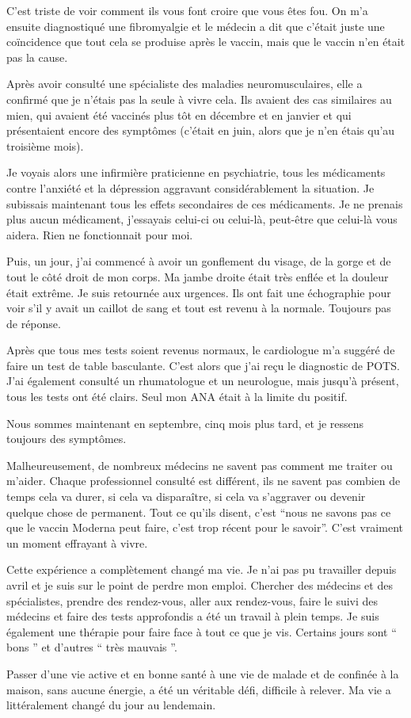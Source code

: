 C'est triste de voir comment ils vous font croire que vous êtes fou. On m'a
ensuite diagnostiqué une fibromyalgie et le médecin a dit que c'était juste une
coïncidence que tout cela se produise après le vaccin, mais que le vaccin n'en
était pas la cause.

Après avoir consulté une spécialiste des maladies neuromusculaires, elle a
confirmé que je n'étais pas la seule à vivre cela. Ils avaient des cas
similaires au mien, qui avaient été vaccinés plus tôt en décembre et en janvier
et qui présentaient encore des symptômes (c'était en juin, alors que je n'en
étais qu'au troisième mois).

Je voyais alors une infirmière praticienne en psychiatrie, tous les médicaments
contre l'anxiété et la dépression aggravant considérablement la situation. Je
subissais maintenant tous les effets secondaires de ces médicaments. Je ne
prenais plus aucun médicament, j'essayais celui-ci ou celui-là, peut-être que
celui-là vous aidera. Rien ne fonctionnait pour moi.

Puis, un jour, j'ai commencé à avoir un gonflement du visage, de la gorge et de
tout le côté droit de mon corps. Ma jambe droite était très enflée et la douleur
était extrême. Je suis retournée aux urgences. Ils ont fait une échographie pour
voir s'il y avait un caillot de sang et tout est revenu à la normale. Toujours
pas de réponse.

Après que tous mes tests soient revenus normaux, le cardiologue m'a suggéré de
faire un test de table basculante. C'est alors que j'ai reçu le diagnostic de
POTS. J'ai également consulté un rhumatologue et un neurologue, mais jusqu'à
présent, tous les tests ont été clairs. Seul mon ANA était à la limite du
positif.

Nous sommes maintenant en septembre, cinq mois plus tard, et je ressens toujours
des symptômes.

Malheureusement, de nombreux médecins ne savent pas comment me traiter ou
m'aider. Chaque professionnel consulté est différent, ils ne savent pas combien
de temps cela va durer, si cela va disparaître, si cela va s'aggraver ou devenir
quelque chose de permanent. Tout ce qu'ils disent, c'est “nous ne savons pas ce
que le vaccin Moderna peut faire, c'est trop récent pour le savoir”. C'est
vraiment un moment effrayant à vivre.

Cette expérience a complètement changé ma vie. Je n'ai pas pu travailler depuis
avril et je suis sur le point de perdre mon emploi. Chercher des médecins et des
spécialistes, prendre des rendez-vous, aller aux rendez-vous, faire le suivi des
médecins et faire des tests approfondis a été un travail à plein temps. Je suis
également une thérapie pour faire face à tout ce que je vis. Certains jours sont
“ bons ” et d'autres “ très mauvais ”.

Passer d'une vie active et en bonne santé à une vie de malade et de confinée à
la maison, sans aucune énergie, a été un véritable défi, difficile à relever. Ma
vie a littéralement changé du jour au lendemain.
